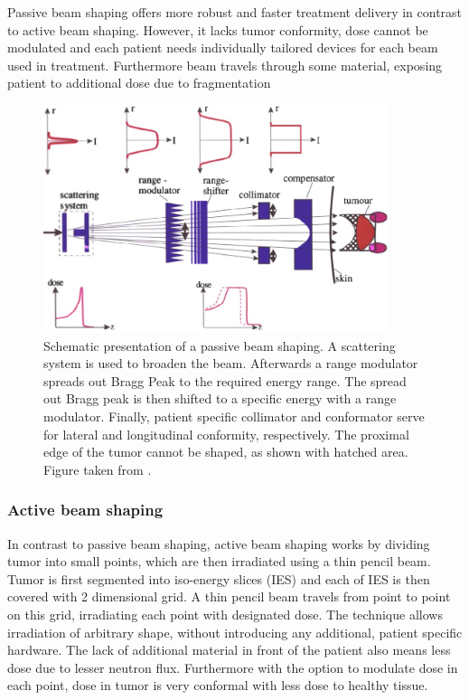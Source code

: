 \documentclass[type=dr, dr=rernat, accentcolor=tud7b,colorbacktitle, bigchapter, openright, twoside, 12pt ]{tudthesis}
\begin{document}
Passive beam shaping offers more robust and faster treatment delivery in contrast to active beam shaping. However, it lacks tumor conformity, dose cannot be modulated and each patient needs individually tailored devices for each beam used in treatment.
 Furthermore beam travels through some material, exposing patient to additional dose due to fragmentation

\begin{figure}[H]
\begin{center}
\includegraphics[width=0.9\textwidth]{./Images/deliverypassive.png}
\caption{Schematic presentation of a passive beam shaping. A scattering system is used to broaden the beam. Afterwards a range modulator spreads out Bragg Peak to the required energy range.
The spread out Bragg peak is then shifted to a specific energy with a range modulator. Finally, patient specific collimator and conformator serve for lateral and longitudinal conformity, respectively.
The proximal edge of the tumor cannot be shaped, as shown with hatched area. Figure taken from \cite{Sch10}.}
\label{passive}
\end{center}
\end{figure}

\subsubsection{Active beam shaping}
\label{Sec::Active}

In contrast to passive beam shaping, active beam shaping works by dividing tumor into small points, which are then irradiated using a thin pencil beam. Tumor is first segmented into iso-energy slices (IES) and each of IES
is then covered with 2 dimensional grid. A thin pencil beam travels from point to point on this grid, irradiating each point with designated dose. The technique allows irradiation of arbitrary shape, without introducing any additional, patient specific 
hardware. The lack of additional material in front of the patient also means less dose due to lesser neutron flux. Furthermore with the option to modulate dose in each point, dose in tumor is very conformal with less dose to healthy tissue.
\end{document}
